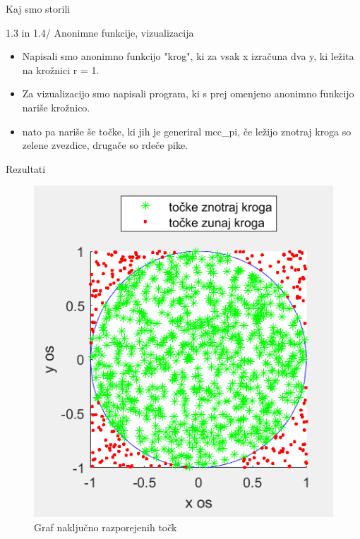 \documentclass{beamer}
\begin{document}
\begin{frame}{Kaj smo storili}
\begin{block}{1.3 in 1.4/ Anonimne funkcije, vizualizacija}
\begin{itemize}
\item Napisali smo anonimno funkcijo  "krog", ki za vsak x izračuna dva y, ki ležita na krožnici r = 1.
\pause
\item Za vizualizacijo smo napisali program, ki s prej omenjeno anonimno funkcijo nariše krožnico.
\pause
\item nato pa nariše še točke, ki jih je generiral mcc\_pi, če ležijo znotraj kroga so zelene zvezdice, drugače so rdeče pike.
\end{itemize}
\end{block}
\end{frame}

\begin{frame}{Rezultati}

\begin{center}
    

\begin{figure}[h]
\includegraphics[scale=0.4]{Slike/tocke.png}
\caption{Graf naključno razporejenih točk}


\end{figure}
\end{center}

\end{frame}
\end{document}
